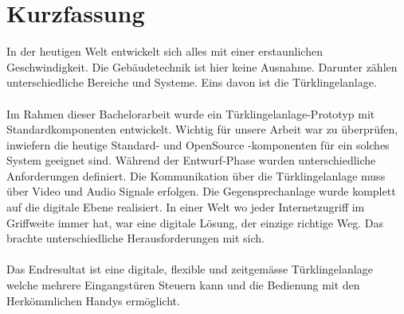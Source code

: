 \section*{Kurzfassung}
\label{sec:zusammenfassung}

In der heutigen Welt entwickelt sich alles mit einer erstaunlichen Geschwindigkeit. Die Gebäudetechnik ist hier keine Ausnahme. Darunter zählen unterschiedliche Bereiche und Systeme. Eins davon ist die Türklingelanlage.
\\
\\
Im Rahmen dieser Bachelorarbeit wurde ein Türklingelanlage-Prototyp mit Standardkomponenten entwickelt. Wichtig für unsere Arbeit war zu überprüfen, inwiefern die heutige Standard- und OpenSource -komponenten für ein solches System geeignet sind.
Während der Entwurf-Phase wurden unterschiedliche Anforderungen definiert. Die Kommunikation über die Türklingelanlage muss über Video und Audio Signale erfolgen. Die Gegensprechanlage wurde komplett auf die digitale Ebene realisiert. In einer Welt wo jeder Internetzugriff im Griffweite immer hat, war eine digitale Lösung, der einzige richtige Weg. Das brachte unterschiedliche Herausforderungen mit sich. 
\\
\\
Das Endresultat ist eine digitale, flexible und zeitgemässe Türklingelanlage welche mehrere Eingangstüren Steuern kann und die Bedienung mit den Herkömmlichen Handys ermöglicht. 